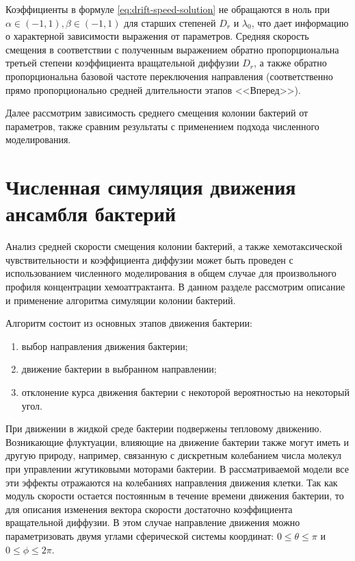 Коэффициенты в формуле \cref{eq:drift-speed-solution} не обращаются в ноль при $\alpha \in (-1, 1), \beta \in (-1, 1)$ для старших степеней $D_r$ и $\lambda_0$, что дает информацию о характерной зависимости выражения от параметров. Средняя скорость смещения в соответствии с полученным выражением обратно пропорциональна третьей степени коэффициента вращательной диффузии $D_r$, а также обратно пропорциональна базовой частоте переключения направления (соответственно прямо пропорционально средней длительности этапов <<Вперед>>). 

Далее рассмотрим зависимость среднего смещения колонии бактерий от параметров, также сравним результаты с применением подхода численного моделирования.

\section{Численная симуляция движения ансамбля бактерий}\label{sec:ch2/sec4}

Анализ средней скорости смещения колонии бактерий, а также хемотаксической чувствительности и коэффициента диффузии может быть проведен с использованием численного моделирования в общем случае для произвольного профиля концентрации хемоаттрактанта. В данном разделе рассмотрим описание и применение алгоритма симуляции колонии бактерий.

Алгоритм состоит из основных этапов движения бактерии: 
\begin{enumerate}
    \item выбор направления движения бактерии;
    \item движение бактерии в выбранном направлении;
    \item отклонение курса движения бактерии с некоторой вероятностью на некоторый угол.
\end{enumerate}

При движении в жидкой среде бактерии подвержены тепловому движению. Возникающие флуктуации, влияющие на движение бактерии также могут иметь и другую природу, например, связанную с дискретным колебанием числа молекул при управлении жгутиковыми моторами бактерии. В рассматриваемой модели все эти эффекты отражаются на колебаниях направления движения клетки. Так как модуль скорости остается постоянным в течение времени движения бактерии, то для описания изменения вектора скорости достаточно коэффициента вращательной диффузии. В этом случае направление движения можно параметризовать двумя углами сферической системы координат: $0 \leq \theta \leq \pi$ и $0 \leq \phi \leq 2\pi$. 

